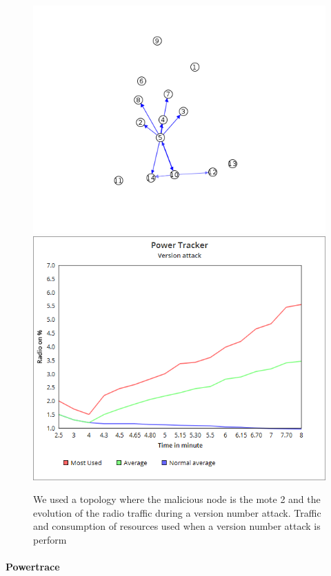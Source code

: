 \documentclass[11pt]{report}
\begin{document}
\begin{figure}
        \includegraphics[scale=0.37]{img/versionStat2}
    \includegraphics[scale=0.4]{img/versionStat}
    \caption{We used a topology where the malicious node is the mote 2 and the
        evolution of the radio traffic during a version number attack.
        Traffic and consumption of resources used when a version
    number attack is perform}
    \label{fig:vna3}
\end{figure}

\paragraph{Powertrace}
\end{document}
